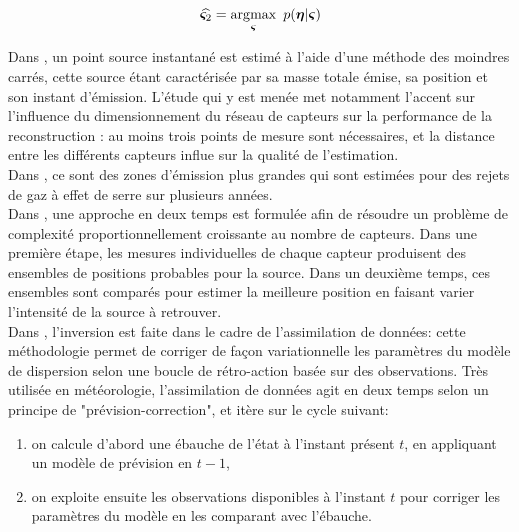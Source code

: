 \begin{equation}
\widehat{{\bm{\varsigma}}_2} = \operatorname*{\arg\!\max}_{\bm{\varsigma}}~ p({\bm{\eta}} | {\bm{\varsigma}})
\label{eq_ML_MCO}
\end{equation}

Dans \cite{Kathirgamanathan2002}, un point source instantané est estimé à l'aide d'une méthode des moindres carrés, cette source étant caractérisée par sa masse totale émise, sa position et son instant d'émission. L'étude qui y est menée met notamment l'accent sur l'influence du dimensionnement du réseau de capteurs sur la performance de la reconstruction : au moins trois points de mesure sont nécessaires, et la distance entre les différents capteurs influe sur la qualité de l'estimation.\\

Dans \cite{Ryall2001}, ce sont des zones d'émission plus grandes qui sont estimées pour des rejets de gaz à effet de serre sur plusieurs années. \\

Dans \cite{Matthes2005}, une approche en deux temps est formulée afin de résoudre un problème de complexité proportionnellement croissante au nombre de capteurs. Dans une première étape, les mesures individuelles de chaque capteur produisent des ensembles de positions probables pour la source. Dans un deuxième temps, ces ensembles sont comparés pour estimer la meilleure position en faisant varier l'intensité de la source à retrouver. \\

 Dans \cite{Robertson1998}, l'inversion est faite dans le cadre de l'assimilation de données: cette méthodologie permet de corriger de façon variationnelle les paramètres du modèle de dispersion selon une boucle de rétro-action basée sur des observations. Très utilisée en météorologie, l'assimilation de données agit en deux temps selon un principe de "prévision-correction", et itère sur le cycle suivant:
 \begin{enumerate}
 	\item  on calcule d'abord une ébauche de l'état à l'instant présent $t$, en appliquant un modèle de prévision en $t-1$,
 	\item  on exploite ensuite les observations disponibles à l'instant $t$ pour corriger les paramètres du modèle en les comparant avec l'ébauche. \\
 \end{enumerate}
 
